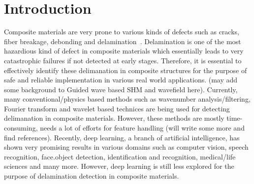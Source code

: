 \section{Introduction}
Composite materials are very prone to various kinds of defects such as cracks, fiber breakage, debonding and delamination~\cite{ip2004delamination}. Delamination is one of the most hazardious kind of defect in composite materials which essentially leads to very catastrophic failures if not detected at early stages. Therefore, it is essential to effectively identify these delimanation in composite structures for the purpose of safe and reliable implementation in various real world applications. (may add some background to Guided wave based SHM and wavefield here). Currently, many conventional/physics based methods such as wavenumber analysis/filtering, Fourier transform and wavelet based technices are being used for detecting delimanation in composite materials. However, these methods are mostly time-consuming, needs a lot of efforts for feature handling (will write some more and find references). Recently, deep learning, a branch of artificial intelligence, has shown very promising results in various domains such as computer vision, speech recognition, face.object detection, identification and recognition, medical/life sciences and many more. However, deep learning is still less explored for the purpose of delamination detection in composite materials.   


